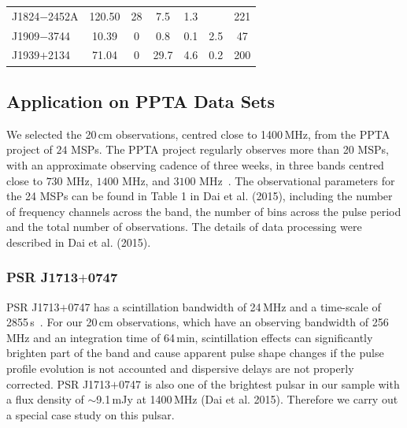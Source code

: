 \documentclass[useAMS,usenatbib]{mn2e}
\begin{document}
\begin{table}
\begin{center}
\begin{tabular}{lcc|cccc}
J1824$-$2452A  & 120.50  & 28      & 7.5 & 1.3 &  & 221    \\
J1909$-$3744   & 10.39   & 0       & 0.8 & 0.1 & 2.5 & 47     \\
J1939$+$2134   & 71.04   & 0       & 29.7 & 4.6 & 0.2 & 200    \\
\hline
\end{tabular}
\end{center}
\end{table}

\subsection{Application on PPTA Data Sets}

We selected the 20\,cm observations, centred close to 1400\,MHz, from the PPTA project 
of $24$ MSPs. 
%
The PPTA project regularly observes more than 20 MSPs, with an approximate observing 
cadence of three weeks, in three bands centred close to $730$ MHz, $1400$ MHz, and $3100$ 
MHz~\citep{Manchester13}. 
%
The observational parameters for the 24 MSPs can be found in Table 1 in Dai et al. (2015), 
including the number of frequency channels across the band, the number of bins across the 
pulse period and the total number of observations.
%
The details of data processing were described in Dai et al. (2015).

\subsubsection{PSR J1713$+$0747}

PSR J1713$+$0747 has a scintillation bandwidth of 24\,MHz and a time-scale of 2855\,s~\citep{Keith13}. 
For our 20\,cm observations, which have an observing bandwidth of 256\,MHz and an 
integration time of 64\,min, scintillation effects can significantly brighten part 
of the band and cause apparent pulse shape changes if the pulse profile evolution 
is not accounted and dispersive delays are not properly corrected.
%
PSR J1713$+$0747 is also one of the brightest pulsar in our sample with a flux density 
of $\sim$9.1\,mJy at 1400\,MHz (Dai et al. 2015). Therefore we carry out a special 
case study on this pulsar. 
%
\end{document}
